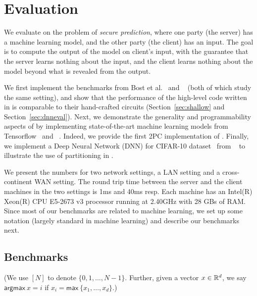 \section{Evaluation}
\label{sec:eval}
We evaluate \tool on the problem of {\it secure prediction}, where one
party (the server) has a machine learning model, and the other party
(the client) has an input. The goal is to compute the output of the
model on client's input, with the guarantee that the server
learns nothing about the input, and the client learns nothing
about the model beyond what is revealed from the output.

We first implement the benchmarks from Bost et al.~\cite{shafindss}
and \minion~\cite{minionn} (both of which study the same setting),
and show that the performance of the high-level code written in \tool
is comparable to their hand-crafted circuits
(Section~\ref{sec:shallow} and Section~\ref{sec:dnneval}).
%
Next, we demonstrate the generality and programmability aspects of
\tool by implementing state-of-the-art machine learning models from
Tensorflow~\cite{tensorflow} and \bonsai~\cite{bonsai}. Indeed, we
provide the first 2PC implementation of \bonsai.
%
Finally, we
implement a Deep Neural Network (DNN) for CIFAR-10
dataset~\cite{cifar} from \minion~\cite{minionn} to illustrate the use
of partitioning in \tool.

We present the numbers for two network settings, a LAN setting and
a cross-continent WAN setting. The round trip time between the server
and the client machines in the two settings is 1ms and 40ms resp. Each
machine has an Intel(R) Xeon(R) CPU E5-2673 v3 processor running at
2.40GHz with 28 GBs of RAM.
%
Since most of our benchmarks
are related to machine learning, we set up some notation (largely
standard in machine learning) and describe our benchmarks next.

\subsection{Benchmarks}

\noindent(We use $[N]$ to denote $\{0,1,\dotsc, N-1\}$. 
Further, given a vector $x\in{\mathbb{R}}^d$, we say $\mathsf{argmax}\ x = i$ if
$x_i = \mathsf{max}\ \{x_1,\ldots,x_d\}$.)

